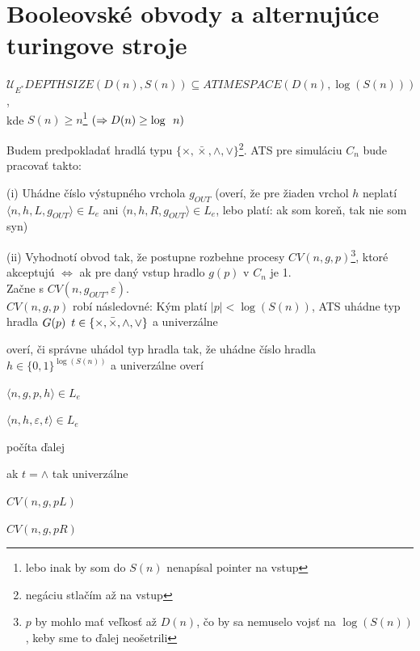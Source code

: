 \section{Booleovské obvody a alternujúce turingove stroje}

\begin{veta}\label{Veta3}
$\mathcal{U}_{E^*} DEPTHSIZE(D(n),S(n))\subseteq ATIMESPACE(D(n),\log(S(n)))$,\\ kde
$S(n)\geq n$\footnote{lebo inak by som do $S(n)$ nenapísal pointer na vstup}
$(\Rightarrow D(n)\geq \log \enspace n)$
\end{veta}

\begin{dokaz}
Budem predpokladať hradlá typu $\{\times, \bar{\times}, \wedge, \vee \}$\footnote{negáciu
stlačím až na vstup}. ATS pre simuláciu $C_n$ bude pracovať takto:
\begin{description}
\item{(i) }Uhádne číslo výstupného vrchola $g_{OUT}$ (overí, že pre žiaden vrchol $h$
neplatí $\langle n,h,L,g_{OUT} \rangle \in L_e$ ani $\langle n,h,R,g_{OUT} \rangle \in
L_e$, lebo platí: ak som koreň, tak nie som syn)
\item{(ii) }Vyhodnotí obvod tak, že postupne rozbehne procesy $CV(n,g,p)$\footnote{$p$ by
mohlo mať veľkosť až $D(n)$, čo by sa nemuselo vojsť na $\log(S(n))$, keby sme to ďalej
neošetrili}, ktoré akceptujú $\Leftrightarrow$ ak pre daný vstup hradlo $g(p)$ v $C_n$ je
1.
\\ Začne s $CV(n,g_{OUT},\varepsilon)$.\\ $CV(n,g,p)$ robí následovné: Kým platí
$|p|<\log(S(n))$, ATS uhádne typ hradla $G(p)\enspace t\in
\{\times,\bar{\times},\wedge,\vee\}$ a univerzálne
\begin{enumerate}
\item overí, či správne uhádol typ hradla tak, že uhádne číslo hradla
$h\in\{0,1\}^{\log(S(n))}$ a univerzálne overí
\begin{description}
\item $\langle n,g,p,h\rangle\in L_e$
\item $\langle n,h,\varepsilon,t \rangle \in L_e$
\end{description}
\item počíta ďalej
\begin{description}
\item ak $t=\wedge$ tak univerzálne
\begin{description}
\item $CV(n,g,pL)$
\item $CV(n,g,pR)$

\end{description}
\end{description}
\end{enumerate}
\end{description}
\end{dokaz}
